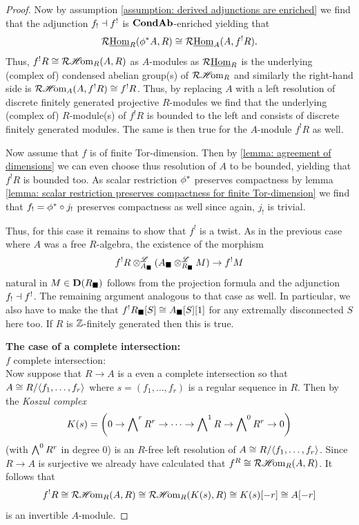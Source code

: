 \begin{proof}
	Now by assumption \ref{assumption: derived adjunctions are enriched} we find that the adjunction $f_!\dashv f^!$ is ${{{\mathbf{Cond}}}{{\mathbf{Ab}}}}$-enriched yielding that
		$$\mathcal{R}{\underline{\operatorname{Hom}}}_R({\phi^\ast}A, R) \cong \mathcal{R}{\underline{\operatorname{Hom}}}_A(A, f^!R).$$
	Thus, $f^!R \cong \mathcal{R}{\operatorname{\mathscr{H}\!om}}_R(A, R)$ as $A$-modules as $\mathcal{R}{\underline{\operatorname{Hom}}}_R$ is the underlying (complex of) condensed abelian group(s) of $\mathcal{R}{\operatorname{\mathscr{H}\!om}}_R$ and similarly the right-hand side is $\mathcal{R}{\operatorname{\mathscr{H}\!om}}_A(A, f^!R)\cong f^!R$. Thus, by replacing $A$ with a left resolution of discrete finitely generated projective $R$-modules we find that the underlying (complex of) $R$-module(s) of $f^!R$ is bounded to the left and consists of discrete finitely generated modules. The same is then true for the $A$-module $f^!R$ as well.
	
	Now assume that $f$ is of finite Tor-dimension. Then by \ref{lemma: agreement of dimensions} we can even choose thus resolution of $A$ to be bounded, yielding that $f^!R$ is bounded too. As scalar restriction ${\phi^\ast}$ preserves compactness by lemma \ref{lemma: scalar restriction preserves compactness for finite Tor-dimension} we find that $f_!={\phi^\ast}\circ j_!$ preserves compactness as well since again, $j_!$ is trivial.
	
	Thus, for this case it remains to show that $f^!$ is a twist. As in the previous case where $A$ was a free $R$-algebra, the existence of the morphism
		$$f^!R\otimes^{\mathscr{L}}_{A_\blacksquare}(A_\blacksquare\otimes^{\mathscr{L}}_{R_\blacksquare} M) \to f^!M$$
	natural in $M\in {{\mathbf{D}}(R_\blacksquare)}$ follows from the projection formula and the adjunction $f_!\dashv f^!$. The remaining argument analogous to that case as well. In particular, we also have to make the \assumptionPreWord that $f^!{R_\blacksquare[S]}\cong {A_\blacksquare[S]}[1]$ for any extremally disconnected $S$ here too. If $R$ is ${\mathbb{Z}}$-finitely generated then this is true.
	
	\textbf{The case of a complete intersection:}\\
	$f$ complete intersection:\\
	Now suppose that $R\to A$ is a even a complete intersection so that $A \cong R/{\langle f_1,\dots, f_r\rangle}$ where $s=(f_1,\dots,f_r)$ is a regular sequence in $R$. Then by \cite[Cor. 4.5.5]{weibel-homological-algebra} the \emph{Koszul complex}
		$$K(s) = \mleft(0\to \exterior^r R^r \to \cdots \to \exterior^1 R \to \exterior^0 R^r \to 0\mright)$$
	(with $\bigwedge\nolimits^0R^r$ in degree $0$) is an $R$-free left resolution of $A \cong R/{\langle f_1,\dots, f_r\rangle}$. Since $R\to A$ is surjective we already have calculated that $f^R\cong \mathcal{R}{\operatorname{\mathscr{H}\!om}}_R(A, R)$. It follows that
		$$f^!R \cong \mathcal{R}{\operatorname{\mathscr{H}\!om}}_R(A, R) \cong \mathcal{R}{\operatorname{\mathscr{H}\!om}}_R(K(s), R) \cong K(s)[-r]\cong A[-r]$$
	is an invertible $A$-module.
\end{proof}



